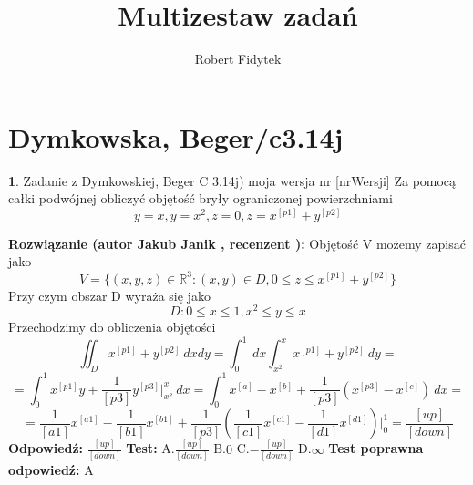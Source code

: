 \documentclass[12pt, a4paper]{article}
\title{Multizestaw zadań}
\author{Robert Fidytek}
\date{}
\theoremstyle{definition} %
\newtheorem{zad}{}
\newcommand{\kategoria}[1]{\section{#1}} %
\newcommand{\zadStart}[1]{\begin{zad}#1\newline} %
\newcommand{\zadStop}{\end{zad}}   %
\newcommand{\rozwStart}[2]{\noindent \textbf{Rozwiązanie (autor #1 , recenzent #2): }\newline} %
\newcommand{\rozwStop}{\newline}                                            %
\newcommand{\odpStart}{\noindent \textbf{Odpowiedź:}\newline}    %
\newcommand{\odpStop}{\newline}                                             %
\newcommand{\testStart}{\noindent \textbf{Test:}\newline} %
\newcommand{\testStop}{\newline} %
\newcommand{\kluczStart}{\noindent \textbf{Test poprawna odpowiedź:}\newline} %
\newcommand{\kluczStop}{\newline} %
\begin{document}
\maketitle


\kategoria{Dymkowska, Beger/c3.14j}
\zadStart{Zadanie z Dymkowskiej, Beger C 3.14j) moja wersja nr [nrWersji]}
Za pomocą całki podwójnej obliczyć objętość bryły ograniczonej powierzchniami $$y=x, y=x^2, z=0, z=x^{[p1]}+y^{[p2]}$$
\zadStop
\rozwStart{Jakub Janik}{}
Objętość V możemy zapisać jako
$$V=\{(x,y,z)\in\mathbb{R}^3\colon(x,y)\in D, 0 \leq z \leq x^{[p1]}+y^{[p2]}\}$$
Przy czym obszar D wyraża się jako
$$D\colon 0 \leq x \leq 1, x^2 \leq y \leq x$$
Przechodzimy do obliczenia objętości
$$\iint_D x^{[p1]}+y^{[p2]}\ dxdy=\int_0^1\ dx\int_{x^2}^x x^{[p1]}+y^{[p2]}\ dy=$$
$$=\int_0^1 x^{[p1]}y+\frac{1}{[p3]}y^{[p3]}\Big|_{x^2}^x\ dx=\int_0^1 x^{[a]}-x^{[b]}+\frac{1}{[p3]}(x^{[p3]}-x^{[c]})\ dx=$$
$$=\frac{1}{[a1]}x^{[a1]}-\frac{1}{[b1]}x^{[b1]}+\frac{1}{[p3]}(\frac{1}{[c1]}x^{[c1]}-\frac{1}{[d1]}x^{[d1]})\Big|_0^1=\frac{[up]}{[down]}$$
\rozwStop
\odpStart
$\frac{[up]}{[down]}$
\odpStop
\testStart
A.$\frac{[up]}{[down]}$
B.$0$
C.$-\frac{[up]}{[down]}$
D.$\infty$
\testStop
\kluczStart
A
\kluczStop
\end{document}

